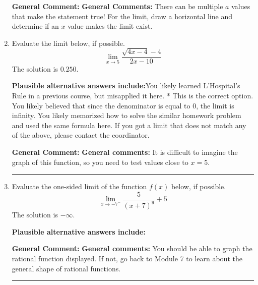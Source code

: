 \documentclass{extbook}[14pt]
\newcommand{\litem}[1]{\item #1

\rule{\textwidth}{0.4pt}}
\begin{document}
\begin{enumerate}
{\begin{enumerate}[label=\Alph*.]
\end{enumerate}

\textbf{General Comment:} \textbf{General Comments:} There can be multiple $a$ values that make the statement true! For the limit, draw a horizontal line and determine if an $x$ value makes the limit exist.
}
\litem{
Evaluate the limit below, if possible.
\[ \lim_{x \rightarrow 5} \frac{\sqrt{4x - 4} - 4}{2x - 10} \]The solution is \( 0.250 \).\begin{enumerate}[label=\Alph*.]
\textbf{Plausible alternative answers include:}You likely learned L'Hospital's Rule in a previous course, but misapplied it here.
* This is the correct option.
You likely believed that since the denominator is equal to 0, the limit is infinity.
You likely memorized how to solve the similar homework problem and used the same formula here.
If you got a limit that does not match any of the above, please contact the coordinator.
\end{enumerate}

\textbf{General Comment:} \textbf{General comments:} It is difficult to imagine the graph of this function, so you need to test values close to $x = 5$.
}
\litem{
Evaluate the one-sided limit of the function $f(x)$ below, if possible.
\[ \lim_{x \rightarrow -7^-} \frac{5}{(x+7)^9}+5 \]The solution is \( -\infty \).\begin{enumerate}[label=\Alph*.]
\textbf{Plausible alternative answers include:}




\end{enumerate}

\textbf{General Comment:} \textbf{General comments:} You should be able to graph the rational function displayed. If not, go back to Module 7 to learn about the general shape of rational functions.
}
\end{enumerate}
\end{document}
